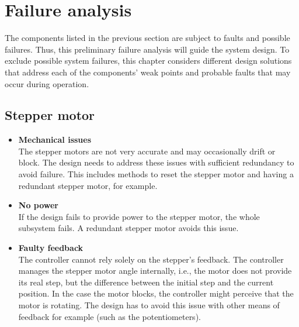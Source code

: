 \section{Failure analysis}
\label{sec:preliminary_analysis}
 The components listed in the previous section are subject to faults and possible failures. Thus, this preliminary failure analysis will guide the system design. To exclude possible system failures, this chapter considers different design solutions that address each of the components' weak points and probable faults that may occur during operation. 

\subsection{Stepper motor}
\begin{itemize}
    \item \textbf{Mechanical issues}\\
    The stepper motors are not very accurate and may occasionally drift or block. The design needs to address these issues with sufficient redundancy to avoid failure. This includes methods to reset the stepper motor and having a redundant stepper motor, for example.
    
    \item \textbf{No power}\\
    If the design fails to provide power to the stepper motor, the whole subsystem fails. A redundant stepper motor avoids this issue. 
    
    \item \textbf{Faulty feedback}\\
    The controller cannot rely solely on the stepper's feedback. The controller manages the stepper motor angle internally, i.e., the motor does not provide its real step, but the difference between the initial step and the current position. In the case the motor blocks, the controller might perceive that the motor is rotating. The design has to avoid this issue with other means of feedback for example (such as the potentiometers).
\end{itemize}



